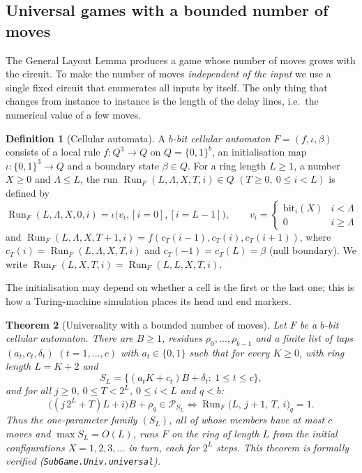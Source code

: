 \documentclass[11pt]{article}
\newtheorem{theorem}{Theorem}
\theoremstyle{definition}
\newtheorem{definition}[theorem]{Definition}
\newcommand{\cP}{\mathcal{P}}
\newcommand{\Run}{\operatorname{Run}}
\begin{document}
\subsection{Universal games with a bounded number of moves}\label{sec:univ}

The General Layout Lemma produces a game whose number of moves grows with the circuit.  To make the
number of moves \emph{independent of the input} we use a single fixed circuit that enumerates all
inputs by itself.  The only thing that changes from instance to instance is the length of the delay
lines, i.e.\ the numerical value of a few moves.

\begin{definition}[Cellular automata]\label{def:ca}
A \emph{$b$-bit cellular automaton} $F=(f,\iota,\beta)$ consists of a local rule
$f:Q^3\to Q$ on $Q=\{0,1\}^b$, an initialisation map $\iota:\{0,1\}^3\to Q$ and a boundary state
$\beta\in Q$.  For a ring length $L\ge1$, a number $X\ge0$ and $\Lambda\le L$, the run
$\Run_F(L,\Lambda,X,T,i)\in Q$ $(T\ge0,\ 0\le i<L)$ is defined by
\[\Run_F(L,\Lambda,X,0,i)=\iota\bigl(v_i,[i=0],[i=L-1]\bigr),\qquad v_i=\begin{cases}\mathrm{bit}_i(X)&i<\Lambda\\0&i\ge\Lambda\end{cases}\]
and $\Run_F(L,\Lambda,X,T+1,i)=f(c_T(i-1),c_T(i),c_T(i+1))$, where $c_T(i)=\Run_F(L,\Lambda,X,T,i)$ and
$c_T(-1)=c_T(L)=\beta$ (null boundary).  We write $\Run_F(L,X,T,i)=\Run_F(L,L,X,T,i)$.
\end{definition}

The initialisation may depend on whether a cell is the first or the last one; this is how a
Turing-machine simulation places its head and end markers.

\begin{theorem}[Universality with a bounded number of moves]\label{thm:univ}
Let $F$ be a $b$-bit cellular automaton.  There are $B\ge1$, residues $\rho_0,\dots,\rho_{b-1}$ and a
finite list of taps $(a_t,c_t,\delta_t)$ $(t=1,\dots,c)$ with $a_t\in\{0,1\}$ such that for every
$K\ge0$, with ring length $L=K+2$ and
\[S_L=\{(a_tK+c_t)B+\delta_t:\ 1\le t\le c\},\]
and for all $j\ge0$, $0\le T<2^{L}$, $0\le i<L$ and $q<b$:
\[
\bigl((j\,2^{L}+T)L+i\bigr)B+\rho_q\in\cP_{S_L}\iff \Run_F\bigl(L,\,j+1,\,T,\,i\bigr)_q=1 .
\]
Thus the one-parameter family $(S_L)$, all of whose members have at most $c$ moves and
$\max S_L=O(L)$, runs $F$ on the ring of length $L$ from the initial configurations
$X=1,2,3,\dots$ in turn, each for $2^L$ steps.  This theorem is formally verified
(\texttt{SubGame.Univ.universal}).
\end{theorem}
\end{document}
